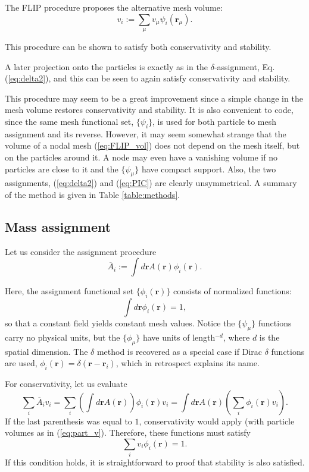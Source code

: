 \documentclass{ws-ijcm}
\newcommand{\bfr}{\mathbf{r}}
\newcommand*{\Ab}{\overline{A}}
\begin{document}
The FLIP procedure proposes the alternative mesh volume:
\begin{equation}
\label{eq:FLIP_vol}
v_i := \sum_\mu v_\mu \psi_i(\bfr_\mu) .
\end{equation}

This procedure can be shown to satisfy both conservativity and
stability.

A later projection onto the particles is exactly as in the
$\delta$-assignment, Eq. (\ref{eq:delta2}), and this can be seen to
again satisfy conservativity and stability.

This procedure may seem to be a great improvement since a simple
change in the mesh volume restores conservativity and stability.  It
is also convenient to code, since the same mesh functional set,
$\{\psi_i\}$, is used for both particle to mesh assignment and its
reverse.  However, it may seem somewhat strange that the volume
of a nodal mesh (\ref{eq:FLIP_vol}) does
not depend on the mesh itself, but on the particles around it.  A node
may even have a vanishing volume if no particles are close to it and the
$\{\psi_\mu\}$ have compact support.  Also, the two assignments,
(\ref{eq:delta2}) and (\ref{eq:PIC}) are clearly unsymmetrical.
A summary of the method is given in Table \ref{table:methods}.



\subsection{Mass assignment}
\label{sec:mass_assignment}

Let us consider the assignment procedure
\begin{equation}
\label{eq:proj}
\Ab_i :=  \int d\bfr A(\bfr) \phi_i(\bfr) .
\end{equation}

Here, the assignment functional set $\{ \phi_i(\bfr) \}$ consists of
normalized functions:
\begin{equation}
\label{eq:delta_norm}
\int d\bfr \phi_i(\bfr) = 1 ,
\end{equation}
so that a constant field yields constant mesh values.  Notice the
$\{\psi_\mu\}$ functions carry no physical units, but the
$\{\phi_\mu\}$ have units of length$^{-d}$, where $d$ is the spatial
dimension.  The $\delta$ method is recovered as a special case if
Dirac $\delta$ functions are used,
$ \phi_i(\bfr) = \delta(\bfr-\bfr_i)$, which in retrospect explains
its name.

For conservativity, let us evaluate
\begin{equation}
\label{eq:cons_check}
\sum_i \Ab_i v_i =
\sum_i
\left(
  \int d\bfr A(\bfr) 
\right)
\phi_i(\bfr) v_i =
\int d\bfr A(\bfr)
\left(
 \sum_i \phi_i(\bfr) v_i 
\right) .
\end{equation}
If the last parenthesis was equal to $1$, conservativity would apply
(with particle volumes as in (\ref{eq:part_v}). Therefore, these
functions must satisfy
\begin{equation}
\label{eq:delta_sum}
\sum_i v_i \phi_i(\bfr) = 1 .
\end{equation}
If this condition holds, it is straightforward to proof that stability
is also satisfied.
\end{document}
